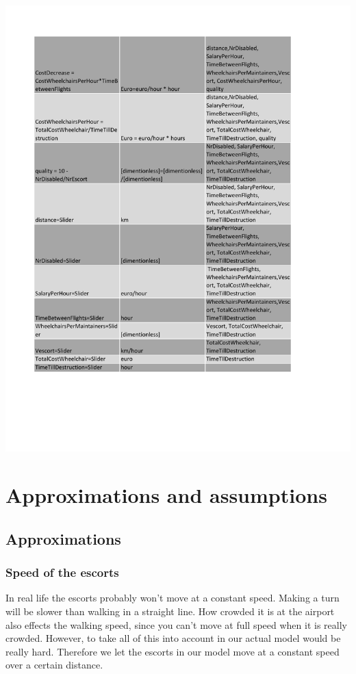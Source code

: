 \documentclass[a4paper, 11pt, notitlepage]{report}
\begin{document}
	\newpage \includegraphics[scale=0.8]{Table2.pdf}

\chapter{Approximations and assumptions}

    \section{Approximations}
        \subsection{Speed of the escorts}
        In real life the escorts probably won't move at a constant speed. Making a turn will be slower than walking in a straight line. How crowded it is at the airport also effects the walking speed, since you can't move at full speed when it is really crowded. However, to take all of this into account in our actual model would be really hard. Therefore we let the escorts in our model move at a constant speed over a certain distance.
\end{document}

